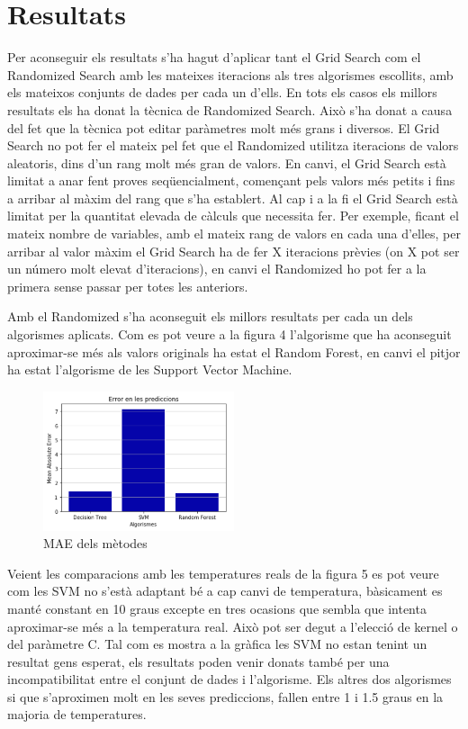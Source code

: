 \documentclass[10pt,a4paper,twocolumn,twoside]{article}
\begin{document}
\section{Resultats}
Per aconseguir els resultats s'ha hagut d'aplicar tant el Grid Search com el Randomized Search amb les mateixes iteracions als tres algorismes escollits, amb els mateixos conjunts de dades per cada un d'ells. En tots els casos els millors resultats els ha donat la tècnica de Randomized Search. Això s'ha donat a causa del fet que la tècnica pot editar paràmetres molt més grans i diversos. El Grid Search no pot fer el mateix pel fet que el Randomized utilitza iteracions de valors aleatoris, dins d'un rang molt més gran de valors. En canvi, el Grid Search està limitat a anar fent proves seqüencialment, començant pels valors més petits i fins a arribar al màxim del rang que s'ha establert. Al cap i a la fi el Grid Search està limitat per la quantitat elevada de càlculs que necessita fer. Per exemple, ficant el mateix nombre de variables, amb el mateix rang de valors en cada una d'elles, per arribar al valor màxim el Grid Search ha de fer X iteracions prèvies (on X pot ser un número molt elevat d'iteracions), en canvi el Randomized ho pot fer a la primera sense passar per totes les anteriors.

Amb el Randomized s'ha aconseguit els millors resultats per cada un dels algorismes aplicats. Com es pot veure a la figura 4 l'algorisme que ha aconseguit aproximar-se més als valors originals ha estat el Random Forest, en canvi el pitjor ha estat l'algorisme de les Support Vector Machine.
\begin{figure}[!h]
\centering
	\includegraphics[width=0.5\textwidth]{../img/comparacioMetricsAlgs}
	\caption{MAE dels mètodes}
	\label{fig-Metrics}
\end{figure}
Veient les comparacions amb les temperatures reals de la figura 5 es pot veure com les SVM no s'està adaptant bé a cap canvi de temperatura, bàsicament es manté constant en 10 graus excepte en tres ocasions que sembla que intenta aproximar-se més a la temperatura real. Això pot ser degut a l'elecció de kernel o del paràmetre C. Tal com es mostra a la gràfica les SVM no estan tenint un resultat gens esperat, els resultats poden venir donats també per una incompatibilitat entre el conjunt de dades i l'algorisme. Els altres dos algorismes si que s'aproximen molt en les seves prediccions, fallen entre 1 i 1.5 graus en la majoria de temperatures.
\end{document}
